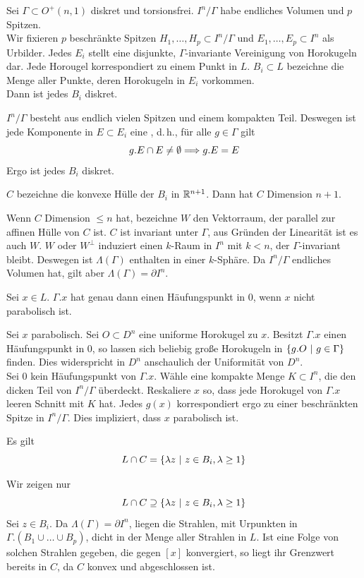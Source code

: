 \documentclass{book}
\begin{document}
\Lem{}
Sei $\Gamma \subset O^+(n,1)$ diskret und torsionsfrei. $I^n / \Gamma$ habe endliches Volumen und $p$ Spitzen.\\
Wir fixieren $p$ beschränkte Spitzen $H_1,\ldots, H_p \subset I^n /\Gamma$ und $E_1,\ldots, E_p \subset I^n$ als Urbilder. Jedes $E_i$ stellt eine disjunkte, $\Gamma$-invariante Vereinigung von Horokugeln dar. Jede Horougel korrespondiert zu einem Punkt in $L$. $B_i \subset L$ bezeichne die Menge aller Punkte, deren Horokugeln in $E_i$ vorkommen.\\
Dann ist jedes $B_i$ diskret.
\begin{Beweis}{}
	$I^n /\Gamma$ besteht aus endlich vielen Spitzen und einem kompakten Teil. Deswegen ist jede Komponente in $E \subset E_i$ eine , d.\,h., für alle $g \in \Gamma$ gilt
	\[ g.E \cap E \neq \emptyset \overset{}{\Longrightarrow} g.E = E \]
	Ergo ist jedes $B_i$ diskret.
\end{Beweis}

\Lem{}
$C$ bezeichne die konvexe Hülle der $B_i$ in $\mathbb{R}^{n+1}$. Dann hat $C$ Dimension $n+1$.
\begin{Beweis}{}
	Wenn $C$ Dimension $\leq n$ hat, bezeichne $W$ den Vektorraum, der parallel zur affinen Hülle von $C$ ist. $C$ ist invariant unter $\Gamma$, aus Gründen der Linearität ist es auch $W$. $W$ oder $W^\bot$ induziert einen $k$-Raum in $I^n$ mit $k< n$, der $\Gamma$-invariant bleibt. Deswegen ist $\Lambda(\Gamma)$ enthalten in einer $k$-Sphäre. Da $I^n /\Gamma$ endliches Volumen hat, gilt aber $\Lambda(\Gamma) = \partial I^n$.
\end{Beweis}

\Lem{}
Sei $x \in L$. $\Gamma.x$ hat genau dann einen Häufungspunkt in $0$, wenn $x$ nicht parabolisch ist.
\begin{Beweis}{}
	Sei $x$ parabolisch. Sei $O \subset D^n$ eine uniforme Horokugel zu $x$. Besitzt $\Gamma.x$ einen Häufungspunkt in $0$, so lassen sich beliebig große Horokugeln in $\set{g.O}{g \in \Gamma}$ finden. Dies widerspricht in $D^n$ anschaulich der Uniformität von $D^n$.\\
	Sei $0$ kein Häufungspunkt von $\Gamma.x$. Wähle eine kompakte Menge $K\subset I^n$, die den dicken Teil von $I^n/\Gamma$ überdeckt. Reskaliere $x$ so, dass jede Horokugel von $\Gamma.x$ leeren Schnitt mit $K$ hat. Jedes $g(x)$ korrespondiert ergo zu einer beschränkten Spitze in $I^n / \Gamma$. Dies impliziert, dass $x$ parabolisch ist.
\end{Beweis}

\Lem{}
Es gilt
\[ L\cap C = \set{\lambda z}{z \in B_i, \lambda \geq 1} \]
\begin{Beweis}{}
	Wir zeigen nur
	\[ L\cap C \supseteq \set{\lambda z}{z \in B_i, \lambda \geq 1} \]
	Sei $z \in B_i$. Da $\Lambda(\Gamma) = \partial I^n$, liegen die Strahlen, mit Urpunkten in $\Gamma.(B_1\cup\ldots \cup B_p)$, dicht in der Menge aller Strahlen in $L$. Ist eine Folge von solchen Strahlen gegeben, die gegen $[x]$ konvergiert, so liegt ihr Grenzwert bereits in $C$, da $C$ konvex und abgeschlossen ist.
\end{Beweis}
\end{document}

